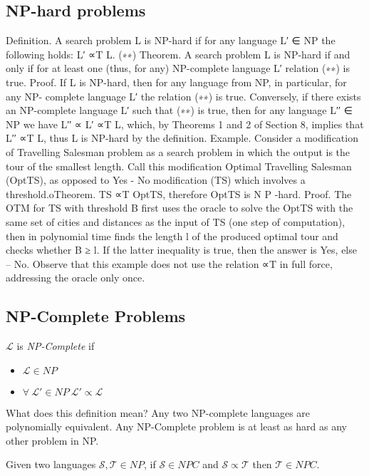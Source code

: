 \subsection{NP-hard problems}
Definition. A search problem L is NP-hard if for any language L′ ∈ NP the following holds:
L′ ∝T L. (∗∗) Theorem. A search problem L is NP-hard if and only if for at least one (thus, for any)
NP-complete language L′ relation (∗∗) is true.
Proof. If L is NP-hard, then for any language from NP, in particular, for any NP- complete language L′ the relation (∗∗) is true.
Conversely, if there exists an NP-complete language L′ such that (∗∗) is true, then for any language L′′ ∈ NP we have
L′′ ∝ L′ ∝T L,
which, by Theorems 1 and 2 of Section 8, implies that L′′ ∝T L, thus L is NP-hard by
the definition.
Example. Consider a modification of Travelling Salesman problem as a search problem in which the output is the tour of the smallest length. Call this modification Optimal Travelling Salesman (OptTS), as opposed to Yes - No modification (TS) which involves a threshold.oTheorem. TS ∝T OptTS, therefore OptTS is N P -hard.
Proof. The OTM for TS with threshold B first uses the oracle to solve the OptTS with the same set of cities and distances as the input of TS (one step of computation), then in polynomial time finds the length l of the produced optimal tour and checks whether B ≥ l. If the latter inequality is true, then the answer is Yes, else – No.
Observe that this example does not use the relation ∝T in full force, addressing the oracle only once.

\subsection{NP-Complete Problems}
\begin{definition}
	$\mathcal{L}$ is \textit{NP-Complete} if
	\begin{itemize}
		\item $\mathcal{L} \in NP$
		\item $\forall\ \mathcal{L\prime} \in NP\ \mathcal{L\prime} \propto \mathcal{L}$
	\end{itemize}
\end{definition}

What does this definition mean?
Any two NP-complete languages are polynomially equivalent.
Any NP-Complete problem is at least as hard as any other problem in NP.

\begin{theorem}
	Given two languages $\mathcal{S}, \mathcal{T} \in NP$,
	if $\mathcal{S} \in NPC$ and $\mathcal{S} \propto \mathcal{T}$ then
	$\mathcal{T} \in NPC$.
\end{theorem}

